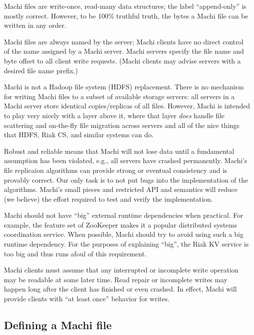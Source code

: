 \documentclass[preprint,10pt]{sigplanconf}
\begin{document}
Machi files are write-once, read-many data structures; the label
``append-only'' is mostly correct.  However, to be 100\% truthful
truth, the bytes a Machi file can be written in any order.

Machi files are always named by the server; Machi clients have no
direct control of the name assigned by a Machi server.  Machi servers
specify the file name and byte offset to all client write requests.
(Machi clients may advise servers with a desired file name prefix.)

Machi is not a Hadoop file system (HDFS) replacement.
There is no mechanism for writing Machi files to a subset of
      available storage servers: all servers in a Machi server store
      identical copies/replicas of all files.
However, Machi is intended to play very nicely with a layer above it,
      where that layer {\em does} handle file scattering and on-the-fly
      file migration across servers and all of the nice things that
      HDFS, Riak CS, and similar systems can do.

Robust and reliable means that Machi will not lose data until a
fundamental assumption has been violated, e.g., all servers have
crashed permanently.  Machi's file replicaion algorithms can provide
strong or eventual consistency and is provably correct.  Our only
task is to not put bugs into the implementation of the algorithms.  Machi's
small pieces and restricted API and semantics will reduce
(we believe) the effort required to test
and verify the implementation.

Machi should not have ``big'' external runtime dependencies when
practical.  For example, the feature set of ZooKeeper makes it a
popular distributed systems coordination service.  When possible,
Machi should try to avoid using such a big runtime dependency.  For
the purposes of explaining ``big'', the Riak KV service is too big and
thus runs afoul of this requirement.

Machi clients must assume that any interrupted or incomplete write
operation may be readable at some later time.  Read repair or
incomplete writes may happen long after the client has finished or
even crashed.  In effect, Machi will provide clients with
``at least once'' behavior for writes.

\subsection{Defining a Machi file}
\end{document}
